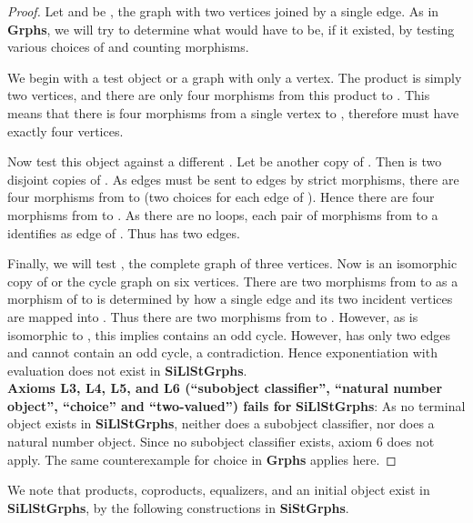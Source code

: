 \documentclass[11pt]{article}
\begin{document}
\begin{proof}
Let  and  be , the graph with two vertices joined by a single edge. As in \textbf{Grphs}, we will try to determine what  would have to be, if it existed, by testing various choices of  and counting morphisms.\par
We begin with a test object  or a graph with only a vertex. The product  is simply two vertices, and there are only four morphisms from this product to . This means that there is four morphisms from a single vertex to , therefore  must have exactly four vertices.\par
Now test this object against a different . Let  be another copy of . Then  is two disjoint copies of . As edges must be sent to edges by strict morphisms, there are four morphisms from  to  (two choices for each edge of ). Hence there are four morphisms from  to . As there are no loops, each pair of morphisms from  to a  identifies as edge of . Thus  has two edges. \par 
Finally, we will test , the complete graph of three vertices. Now  is an isomorphic copy of  or the cycle graph on six vertices. There are two morphisms from  to  as a morphism of  to  is determined by how a single edge and its two incident vertices are mapped into . Thus there are two morphisms from  to . However, as  is isomorphic to , this implies  contains an odd cycle. However,  has only two edges and cannot contain an odd cycle, a contradiction. Hence exponentiation with evaluation does not exist in \textbf{SiLlStGrphs}.\\
\indent \textbf{Axioms L3, L4, L5, and L6 (``subobject classifier'', ``natural number object'', ``choice'' and ``two-valued'') fails for} \textbf{SiLlStGrphs}: As no terminal object exists in \textbf{SiLlStGrphs}, neither does a subobject classifier, nor does a natural number object. Since no subobject classifier exists, axiom 6 does not apply. The same counterexample for choice in \textbf{Grphs} applies here.
\end{proof}
\indent We note that products, coproducts, equalizers, and an initial object exist in \textbf{SiLlStGrphs}, by the following constructions in \textbf{SiStGrphs}.\\
\end{document}
